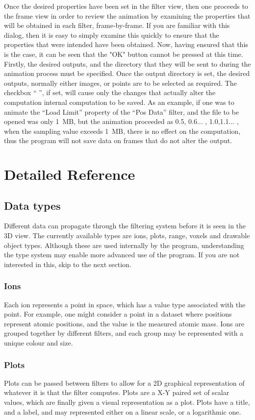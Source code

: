 \documentclass[10pt]{article}
\begin{document}
Once the desired properties have been set in the filter view, then one proceeds to the frame view in order to review the animation by examining the properties that will be obtained in each filter, frame-by-frame. If you are familiar with this dialog, then it is easy to simply examine this quickly to ensure that the properties that were intended have been obtained. Now, having ensured that this is the case, it can be seen that the "OK" button cannot be pressed at this time. Firstly, the desired outputs, and the directory that they will be sent to during the animation process must be specified. Once the output directory is set, the desired outputs, normally either images, or points are to be selected as required. The checkbox `` '',  if set, will cause only the changes that actually alter the computation internal computation to be saved. As an example, if one was to animate the ``Load Limit'' property of the ``Pos Data'' filter, and the file to be opened was only 1~MB, but the animation proceeded as 0.5, 0.6...
,
 1.0,1.1... , when the sampling value exceeds 1~MB, there is no effect on the computation, thus the program will not save data on frames that do not alter the output.

\section{Detailed Reference}
\subsection{Data types}
Different data can propagate through the filtering system before it is seen in the 3D view. The currently available types are ions, plots, range, voxels and drawable object types. Although these are used internally by the program, understanding the type system may enable more advanced use of the program. If you are not interested in this, skip to the next section.  

\subsubsection{Ions}
Each ion represents a point in space, which has a value type associated with the point. For example, one might consider a point in a dataset where positions represent atomic positions, and the value is the measured atomic mass. Ions are grouped together by different filters, and each group may be represented with a unique colour and size.  

\subsubsection{Plots}
Plots can be passed between filters to allow for a 2D graphical representation of whatever it is that the filter computes. Plots are a X-Y paired set of scalar values, which are finally given a visual representation as a plot. Plots have a title, and a label, and may represented either on a linear scale, or a logarithmic one.
\end{document}
